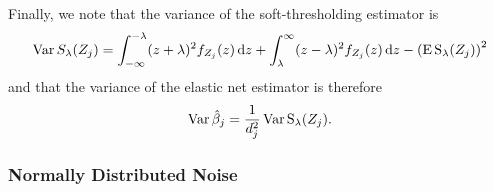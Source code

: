 Finally, we note that the variance of the soft-thresholding estimator is
\begin{equation}
  \label{eq:st-variance}
  \operatorname{Var} {S_\lambda({Z_j})} = \int_{-\infty}^{-\lambda}(z + \lambda)^2f_{Z_j}(z) \mathop{}\!\mathrm{d} z + \int_{\lambda}^\infty (z - \lambda)^2 f_{Z_j}(z) \mathop{}\!\mathrm{d} z - \left(\operatorname{E} \operatorname{S}_\lambda({Z_j})\right)^2
\end{equation}
and that the variance of the elastic net estimator is therefore
\begin{equation*}
  \operatorname{Var} \hat\beta_j = \frac{1}{d_j^2} \operatorname{Var} \operatorname{S}_\lambda({Z_j}).
\end{equation*}

\subsubsection{Normally Distributed Noise}%
\label{sec:normally-distributed-noise}

